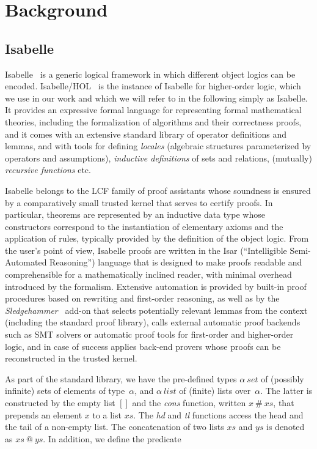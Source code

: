 \documentclass[sigplan,10pt,anonymous,review]{acmart}
\newcommand{\prog}[1]{\textit{#1}}
\begin{document}
\section{Background}
\label{sec:background}

\subsection{Isabelle}
\label{sec:isabelle}

Isabelle~\cite{paulson:isabelle} is a generic logical framework in which different object logics can be encoded. Isabelle/HOL~\cite{nipkow:isabelle} is the instance of Isabelle for higher-order logic, which we use in our work and which we will refer to in the following simply as Isabelle. It provides an expressive formal language for representing formal mathematical theories, including the formalization of algorithms and their correctness proofs, and it comes with an extensive standard library of operator definitions and lemmas, and with tools for defining \emph{locales} (algebraic structures parameterized by operators and assumptions), \emph{inductive definitions} of sets and relations, (mutually) \emph{recursive functions} etc.

Isabelle belongs to the LCF family of proof assistants whose soundness is ensured by a comparatively small trusted kernel that serves to certify proofs. In particular, theorems are represented by an inductive data type whose constructors correspond to the instantiation of elementary axioms and the application of rules, typically provided by the definition of the object logic. From the user's point of view, Isabelle proofs are written in the Isar (``Intelligible Semi-Automated Reasoning'') language that is designed to make proofs readable and comprehensible for a mathematically inclined reader, with minimal overhead introduced by the formalism. Extensive automation is provided by built-in proof procedures based on rewriting and first-order reasoning, as well as by the \emph{Sledgehammer}~\cite{blanchette:sledgehammer} add-on that selects potentially relevant lemmas from the context (including the standard proof library), calls external automatic proof backends such as SMT solvers or automatic proof tools for first-order and higher-order logic, and in case of success applies back-end provers whose proofs can be reconstructed in the trusted kernel.

As part of the standard library, we have the pre-defined types $\alpha~\prog{set}$ of (possibly infinite) sets of elements of type~$\alpha$, and $\alpha~\prog{list}$ of (finite) lists over~$\alpha$. The latter is constructed by the empty list $[]$ and the \emph{cons} function, written $x\ \#\  xs$, that prepends an element $x$ to a list $xs$. The \prog{hd} and \prog{tl} functions access the head and the tail of a non-empty list. The concatenation of two lists $xs$ and $ys$ is denoted as $xs\ @\ ys$. In addition, we define the predicate
\end{document}
